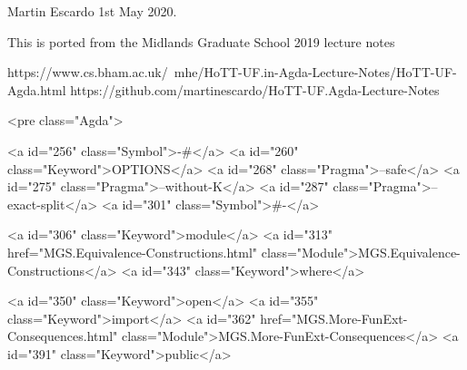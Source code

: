 Martin Escardo 1st May 2020.

This is ported from the Midlands Graduate School 2019 lecture notes

 https://www.cs.bham.ac.uk/~mhe/HoTT-UF.in-Agda-Lecture-Notes/HoTT-UF-Agda.html
 https://github.com/martinescardo/HoTT-UF.Agda-Lecture-Notes

<pre class="Agda">

<a id="256" class="Symbol">{-#</a> <a id="260" class="Keyword">OPTIONS</a> <a id="268" class="Pragma">--safe</a> <a id="275" class="Pragma">--without-K</a> <a id="287" class="Pragma">--exact-split</a> <a id="301" class="Symbol">#-}</a>

<a id="306" class="Keyword">module</a> <a id="313" href="MGS.Equivalence-Constructions.html" class="Module">MGS.Equivalence-Constructions</a> <a id="343" class="Keyword">where</a>

<a id="350" class="Keyword">open</a> <a id="355" class="Keyword">import</a> <a id="362" href="MGS.More-FunExt-Consequences.html" class="Module">MGS.More-FunExt-Consequences</a> <a id="391" class="Keyword">public</a>

